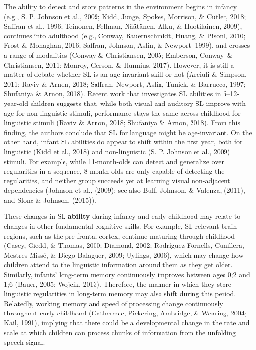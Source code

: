 \documentclass[man,mask,floatsintext]{apa6}
\begin{document}
The ability to detect and store patterns in the environment begins in
infancy (e.g., S. P. Johnson et al., 2009; Kidd, Junge, Spokes,
Morrison, \& Cutler, 2018; Saffran et al., 1996; Teinonen, Fellman,
Näätänen, Alku, \& Huotilainen, 2009), continues into adulthood (e.g.,
Conway, Bauernschmidt, Huang, \& Pisoni, 2010; Frost \& Monaghan, 2016;
Saffran, Johnson, Aslin, \& Newport, 1999), and crosses a range of
modalities (Conway \& Christiansen, 2005; Emberson, Conway, \&
Christiansen, 2011; Monroy, Gerson, \& Hunnius, 2017). However, it is
still a matter of debate whether SL is an age-invariant skill or not
(Arciuli \& Simpson, 2011; Raviv \& Arnon, 2018; Saffran, Newport,
Aslin, Tunick, \& Barrueco, 1997; Shufaniya \& Arnon, 2018). Recent work
that investigates SL abilities in 5--12-year-old children suggests that,
while both visual and auditory SL improve with age for non-linguistic
stimuli, performance stays the same across childhood for linguistic
stimuli (Raviv \& Arnon, 2018; Shufaniya \& Arnon, 2018). From this
finding, the authors conclude that SL for language might be
age-invariant. On the other hand, infant SL abilities do appear to shift
within the first year, both for linguistic (Kidd et al., 2018) and
non-linguistic (S. P. Johnson et al., 2009) stimuli. For example, while
11-month-olds can detect and generalize over regularities in a sequence,
8-month-olds are only capable of detecting the regularities, and neither
group succeeds yet at learning visual non-adjacent dependencies (Johnson
et al., (2009); see also Bulf, Johnson, \& Valenza, (2011), and Slone \&
Johnson, (2015)).

These changes in SL \textbf{ability} during infancy and early childhood
may relate to changes in other fundamental cognitive skills. For
example, SL-relevant brain regions, such as the pre-frontal cortex,
continue maturing through childhood (Casey, Giedd, \& Thomas, 2000;
Diamond, 2002; Rodríguez-Fornells, Cunillera, Mestres-Missé, \&
Diego-Balaguer, 2009; Uylings, 2006), which may change how children
attend to the linguistic information around them as they get older.
Similarly, infants' long-term memory continuously improves between ages
0;2 and 1;6 (Bauer, 2005; Wojcik, 2013). Therefore, the manner in which
they store linguistic regularities in long-term memory may also shift
during this period. Relatedly, working memory and speed of processing
change continuously throughout early childhood (Gathercole, Pickering,
Ambridge, \& Wearing, 2004; Kail, 1991), implying that there could be a
developmental change in the rate and scale at which children can process
chunks of information from the unfolding speech signal.
\end{document}
